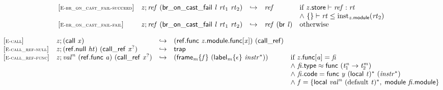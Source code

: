 \vspace{1ex}

$$
\begin{array}{@{}l@{}lcl@{}l@{}}
{[\textsc{\scriptsize E{-}br\_on\_cast\_fail{-}succeed}]} \quad & {\mathit{z}} ; {\mathit{ref}}~(\mathsf{br\_on\_cast\_fail}~{\mathit{l}}~{\mathit{rt}}_{{1}}~{\mathit{rt}}_{{2}}) &\hookrightarrow& {\mathit{ref}} &\quad
  \mbox{if}~{\mathit{z}}.\mathsf{store} \vdash {\mathit{ref}} : {\mathit{rt}} \\
 &&&&\quad {\land}~\{ \begin{array}[t]{@{}l@{}}
 \}\end{array} \vdash {\mathit{rt}} \leq {{\mathrm{inst}}}_{{\mathit{z}}.\mathsf{module}}({\mathit{rt}}_{{2}}) \\
{[\textsc{\scriptsize E{-}br\_on\_cast\_fail{-}fail}]} \quad & {\mathit{z}} ; {\mathit{ref}}~(\mathsf{br\_on\_cast\_fail}~{\mathit{l}}~{\mathit{rt}}_{{1}}~{\mathit{rt}}_{{2}}) &\hookrightarrow& {\mathit{ref}}~(\mathsf{br}~{\mathit{l}}) &\quad
  \mbox{otherwise} \\
\end{array}
$$

\vspace{1ex}

$$
\begin{array}{@{}l@{}lcl@{}l@{}}
{[\textsc{\scriptsize E{-}call}]} \quad & {\mathit{z}} ; (\mathsf{call}~{\mathit{x}}) &\hookrightarrow& (\mathsf{ref.func}~{\mathit{z}}.\mathsf{module}.\mathsf{func}[{\mathit{x}}])~(\mathsf{call\_ref}) &  \\
{[\textsc{\scriptsize E{-}call\_ref{-}null}]} \quad & {\mathit{z}} ; (\mathsf{ref.null}~{\mathit{ht}})~(\mathsf{call\_ref}~{{\mathit{x}}^?}) &\hookrightarrow& \mathsf{trap} &  \\
{[\textsc{\scriptsize E{-}call\_ref{-}func}]} \quad & {\mathit{z}} ; {{\mathit{val}}^{{\mathit{n}}}}~(\mathsf{ref.func}~{\mathit{a}})~(\mathsf{call\_ref}~{{\mathit{x}}^?}) &\hookrightarrow& ({{\mathsf{frame}}_{{\mathit{m}}}}{\{{\mathit{f}}\}}~({{\mathsf{label}}_{{\mathit{m}}}}{\{\epsilon\}}~{{\mathit{instr}}^\ast})) &\quad
  \mbox{if}~{\mathit{z}}.\mathsf{func}[{\mathit{a}}] = {\mathit{fi}} \\
 &&&&\quad {\land}~{\mathit{fi}}.\mathsf{type} \approx \mathsf{func}~({{\mathit{t}}_{{1}}^{{\mathit{n}}}} \rightarrow {{\mathit{t}}_{{2}}^{{\mathit{m}}}}) \\
 &&&&\quad {\land}~{\mathit{fi}}.\mathsf{code} = \mathsf{func}~{\mathit{y}}~{(\mathsf{local}~{\mathit{t}})^\ast}~({{\mathit{instr}}^\ast}) \\
 &&&&\quad {\land}~{\mathit{f}} = \{ \begin{array}[t]{@{}l@{}}
\mathsf{local}~{{\mathit{val}}^{{\mathit{n}}}}~{({\mathrm{default}}~{\mathit{t}})^\ast},\; \mathsf{module}~{\mathit{fi}}.\mathsf{module} \}\end{array} \\
\end{array}
$$

